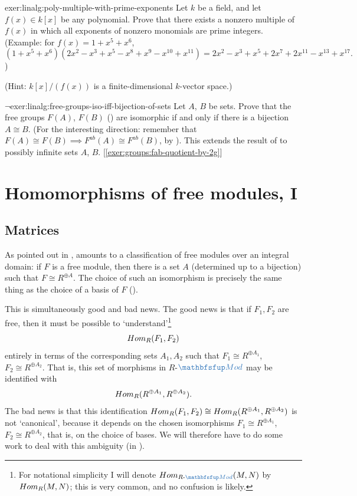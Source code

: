 \begin{exer}{}{exer:linalg:poly-multiple-with-prime-exponents}
  Let $k$ be a field, and let $f(x) \in k[x]$ be any polynomial. Prove
  that there exists a nonzero multiple of $f(x)$ in which all exponents of
  nonzero monomials are prime integers. (Example: for
  $f(x) = 1+x^5+x^6$,
  \[
    (1+x^5+x^6)(2x^2-x^3+x^5-x^8+x^9-x^{10}+x^{11}) =
    2x^2-x^3+x^5+2x^7+2x^{11}-x^{13}+x^{17}.
  \]
  )

  (Hint: $k[x]/(f(x))$ is a finite-dimensional $k$-vector space.)
\end{exer}
\begin{exer}{$\lnot$}{exer:linalg:free-groups-iso-iff-bijection-of-sets}
  Let $A$, $B$ be sets. Prove that the free groups $F(A)$, $F(B)$
  () are isomorphic if and only if
  there is a bijection $A \cong B$. (For the interesting direction:
  remember that $F(A) \cong F(B) \implies F^{ab}(A) \cong F^{ab}(B)$,
  by ). This extends the
  result of
   to
  possibly infinite sets $A$,
  $B$. [\ref{exer:groups:fab-quotient-by-2g}]
\end{exer}

\section{Homomorphisms of free modules, I}
\label{sec:linalg:homomorphisms-of-free-modules-i}


\subsection{Matrices}
\label{subsec:linalg:matrices}
As pointed out in ,
 amounts to a classification of free modules over an
integral domain: if $F$ is a free module, then there is a set $A$
(determined up to a bijection) such that $F \cong R^{\oplus A}$. The
choice of such an isomorphism is precisely the same thing as the
choice of a basis of $F$ ().

This is simultaneously good and bad news. The good news is that if
$F_1, F_2$ are free, then it must be possible to
`understand'\footnote{For notational simplicity I will denote
  $\Hom_{R\text{-}\categ{Mod}}(M,N)$ by $Hom_R(M,N)$; this is very
  common, and no confusion is likely.}
\[
  Hom_R(F_1, F_2)
\]
entirely in terms of the corresponding sets $A_1, A_2$ such that
$F_1 \cong R^{\oplus A_1}$, $F_2 \cong R^{\oplus A_2}$. That is, this
set of morphisms in $R$-$\categ{Mod}$ may be identified with
\[
  Hom_R(R^{\oplus A_1}, R^{\oplus A_2}).
\]
The bad news is that this identification
$Hom_R(F_1, F_2) \cong Hom_R(R^{\oplus A_1}, R^{\oplus A_2})$ is not
`canonical', because it depends on the chosen isomorphisms
$F_1 \cong R^{\oplus A_1}$, $F_2 \cong R^{\oplus A_2}$, that is, on
the choice of bases. We will therefore have to do some work to deal
with this ambiguity (in ).

